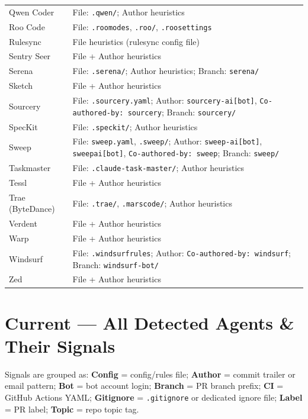 \documentclass[10pt,a4paper]{article}
\begin{document}
\begin{longtable}{L{3cm}L{10.5cm}}
Qwen Coder       & File: \texttt{.qwen/}; Author heuristics \\
Roo Code         & File: \texttt{.roomodes}, \texttt{.roo/}, \texttt{.roosettings} \\
Rulesync         & File heuristics (rulesync config file) \\
Sentry Seer      & File + Author heuristics \\
Serena           & File: \texttt{.serena/}; Author heuristics; Branch: \texttt{serena/} \\
Sketch           & File + Author heuristics \\
Sourcery         & File: \texttt{.sourcery.yaml}; Author: \texttt{sourcery-ai[bot]}, \texttt{Co-authored-by: sourcery}; Branch: \texttt{sourcery/} \\
SpecKit          & File: \texttt{.speckit/}; Author heuristics \\
Sweep            & File: \texttt{sweep.yaml}, \texttt{.sweep/}; Author: \texttt{sweep-ai[bot]}, \texttt{sweepai[bot]}, \texttt{Co-authored-by: sweep}; Branch: \texttt{sweep/} \\
Taskmaster       & File: \texttt{.claude-task-master/}; Author heuristics \\
Tessl            & File + Author heuristics \\
Trae (ByteDance) & File: \texttt{.trae/}, \texttt{.marscode/}; Author heuristics \\
Verdent          & File + Author heuristics \\
Warp             & File + Author heuristics \\
Windsurf         & File: \texttt{.windsurfrules}; Author: \texttt{Co-authored-by: windsurf}; Branch: \texttt{windsurf-bot/} \\
Zed              & File + Author heuristics \\
\end{longtable}


\newpage
\section{Current — All Detected Agents \& Their Signals}

Signals are grouped as: \textbf{Config} = config/rules file; \textbf{Author} = commit trailer or email pattern; \textbf{Bot} = bot account login; \textbf{Branch} = PR branch prefix; \textbf{CI} = GitHub Actions YAML; \textbf{Gitignore} = \texttt{.gitignore} or dedicated ignore file; \textbf{Label} = PR label; \textbf{Topic} = repo topic tag.
\end{document}
